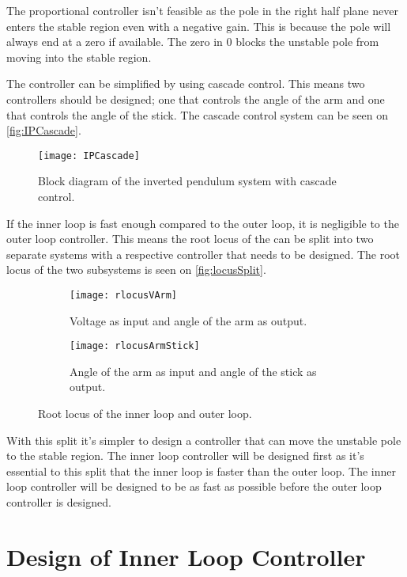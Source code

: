 The proportional controller isn't feasible as the pole in the right half plane never enters the stable region even with a negative gain. This is because the pole will always end at a zero if available. The zero in 0 blocks the unstable pole from moving into the stable region.

The controller can be simplified by using cascade control. This means two controllers should be designed; one that controls the angle of the arm and one that controls the angle of the stick. The cascade control system can be seen on \autoref{fig:IPCascade}.

\begin{figure}[htbp]
\centering
\texttt{[image: IPCascade]}
\caption{Block diagram of the inverted pendulum system with cascade control.}
\label{fig:IPCascade}
\end{figure}

If the inner loop is fast enough compared to the outer loop, it is negligible to the outer loop controller. This means the root locus of the can be split into two separate systems with a respective controller that needs to be designed. The root locus of the two subsystems is seen on \autoref{fig:locusSplit}.
\begin{figure}[htbp]
\centering
	\begin{subfigure}{0.45\textwidth}
	\texttt{[image: rlocusVArm]}
	\caption{Voltage as input and angle of the arm as output.}
	\label{fig:locusVArm}
	\end{subfigure}
	\begin{subfigure}{0.45\textwidth}
	\texttt{[image: rlocusArmStick]}
	\caption{Angle of the arm as input and angle of the stick as output.}
	\end{subfigure}
\caption{Root locus of the inner loop and outer loop.}
\label{fig:locusSplit}
\end{figure}

With this split it's simpler to design a controller that can move the unstable pole to the stable region. The inner loop controller will be designed first as it's essential to this split that the inner loop is faster than the outer loop. The inner loop controller will be designed to be as fast as possible before the outer loop controller is designed.

\section{Design of Inner Loop Controller}

